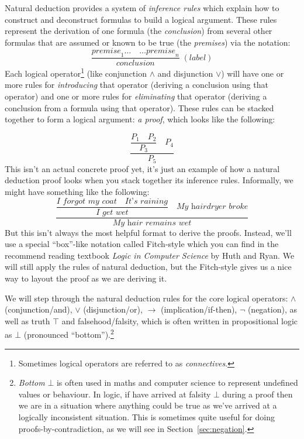 \documentclass{article}
\theoremstyle{definition}
\begin{document}
Natural deduction provides a system of \emph{inference rules} which
explain how to construct and deconstruct formulas to build
a logical argument. These rules represent the derivation of one formula
(the \emph{conclusion}) from several other formulas that are assumed or known to be true
(the \emph{premises}) via the notation:
%
\begin{equation*}
  \dfrac{\textit{premise}_1 \ldots \quad \ldots \textit{premise}_n}
        {\textit{conclusion}}
    \; {(\textit{label})}
\end{equation*}
%
Each logical operator\footnote{Sometimes logical operators are
  referred to as \emph{connectives}.} (like conjunction $\wedge$ and
disjunction $\vee$) will have one or more rules for \emph{introducing}
that operator (deriving a conclusion using that operator) and one or
more rules for \emph{eliminating} that operator (deriving a conclusion from a formula
using that operator). These rules can be stacked together to form a
logical argument: \emph{a proof}, which looks like the following:

\begin{equation*}
\dfrac{\dfrac{P_1 \quad P_2}{P_3} \quad P_4}{P_5}
\end{equation*}
%
This isn't an actual concrete proof yet, it's just an example of how
a natural deduction proof looks when you stack together
its inference rules. Informally, we might have something like the
following:
%
\begin{equation*}
\dfrac{\dfrac{\textit{I forgot my coat} \quad \textit{It's
      raining}}{\textit{I get wet}} \quad \textit{My hairdryer broke}}
       {\textit{My hair remains wet}}
\end{equation*}
%
But this isn't always the most helpful format to derive the
proofs. Instead, we'll use a special ``box''-like notation called
Fitch-style which you can find in the recommend reading textbook
\emph{Logic in Computer Science} by Huth and Ryan.
We will still apply the rules of natural deduction, but the Fitch-style
gives us a nice way to layout the proof as we are deriving it.

We will step through the natural deduction rules for the core logical
operators: $\wedge$ (conjunction/and), $\vee$ (disjunction/or),
$\rightarrow$ (implication/if-then), $\neg$ (negation), as well as
truth $\top$ and falsehood/falsity, which is often written in
propositional logic as $\bot$ (pronounced
``bottom'').\footnote{\emph{Bottom} $\bot$ is often used in maths and
  computer science to represent undefined values or behaviour. In
  logic, if have arrived at falsity $\bot$ during a proof then we are
  in a situation where anything could be true as we've arrived at a
  logically inconsistent situation. This is sometimes quite useful for
  doing proofs-by-contradiction, as we will see in
  Section~\ref{sec:negation}.}
\end{document}
